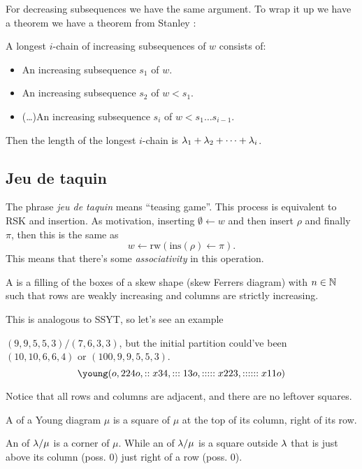 \documentclass[12pt]{memoir}
\begin{document}
For decreasing subsequences we have the same argument. To wrap it up we have a theorem we have a theorem from Stanley \cite{StanleyEnum2}:

\begin{Th}
    A longest $i$-chain of increasing subsequences of $w$ consists of:
    \begin{itemize}
        \item An increasing subsequence $s_1$ of $w$.
        \item An increasing subsequence $s_2$ of $w\less s_1$.
        \item (\dots)An increasing subsequence $s_i$ of $w\less s_1\dots s_{i-1}$.
    \end{itemize}
    Then the length of the longest $i$-chain is $\lambda_1+\lambda_2+\dots+\lambda_i$.
\end{Th}

\subsection{Jeu de taquin}


The phrase \emph{jeu de taquin} means ``teasing game''. This process is equivalent to RSK and insertion. As motivation, inserting $\emptyset\leftarrow w$ and then insert $\rho$ and finally $\pi$, then this is the same as 
$$w\leftarrow\text{rw}(\text{ins}(\rho)\leftarrow \pi).$$
This means that there's some \emph{associativity} in this operation. 

\begin{Def}
    A  is a filling of the boxes of a skew shape (skew Ferrers diagram) with $n\in\mathbb{N}$ such that rows are weakly increasing and columns are strictly increasing.
\end{Def}

This is analogous to SSYT, so let's see an example

\begin{Ex}
    $(9,9,5,5,3)/(7,6,3,3)$, but the initial partition could've been $(10,10,6,6,4)$ or $(100,9,9,5,5,3)$. 
    $$\young(o,224o,::x34,:::13o,:::::x223,::::::x11o)$$
\end{Ex}

Notice that all rows and columns are adjacent, and there are no leftover squares.

\begin{Def}
    A  of a Young diagram $\mu$ is a square of $\mu$ at the top of its column, right of its row.\par 
    An  of $\lambda/\mu$ is a corner of $\mu$. While an  of $\lambda/\mu$ is a square outside $\lambda$ that is just above its column (poss. 0) just right of a row (poss. 0).
\end{Def}
\end{document}
